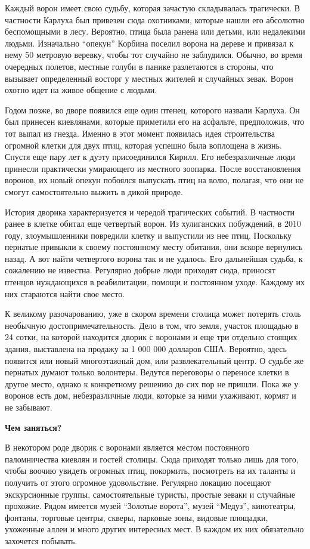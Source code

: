 Каждый ворон имеет свою судьбу, которая зачастую складывалась трагически. В
частности Карлуха был привезен сюда охотниками, которые нашли его абсолютно
беспомощными в лесу. Вероятно, птица была ранена или детьми, или недалекими
людьми. Изначально \enquote{опекун} Корбина поселил ворона на дереве и привязал
к нему 50 метровую веревку, чтобы тот случайно не заблудился. Обычно, во время
очередных полетов, местные голуби в панике разлетаются в стороны, что вызывает
определенный восторг у местных жителей и случайных зевак. Ворон охотно идет на
живое общение с людьми.

Годом позже, во дворе появился еще один птенец, которого назвали Карлуха. Он
был принесен киевлянами, которые приметили его на асфальте, предположив, что
тот выпал из гнезда. Именно в этот момент появилась идея строительства огромной
клетки для двух птиц, которая успешно была воплощена в жизнь. Спустя еще пару
лет к дуэту присоединился Кирилл. Его небезразличные люди принесли практически
умирающего из местного зоопарка. После восстановления воронов, их новый опекун
побоялся выпускать птиц на волю, полагая, что они не смогут самостоятельно
выжить в дикой природе. 

История дворика характеризуется и чередой трагических событий. В частности
ранее в клетке обитал еще четвертый ворон. Из хулиганских побуждений, в 2010
году, злоумышленники повредили клетку и выпустили из нее птиц. Поскольку
пернатые привыкли к своему постоянному месту обитания, они вскоре вернулись
назад. А вот найти четвертого ворона так и не удалось. Его дальнейшая судьба, к
сожалению не известна. Регулярно добрые люди приходят сюда, приносят птенцов
нуждающихся в реабилитации, помощи и постоянном уходе. Каждому их них стараются
найти свое место.

К великому разочарованию, уже в скором времени столица может потерять столь
необычную достопримечательность. Дело в том, что земля, участок площадью в 24
сотки, на которой находится дворик с воронами и еще три отдельно стоящих
здания, выставлена на продажу за 1 000 000 долларов США. Вероятно, здесь
появится или новый многоэтажный дом, или развлекательный центр. О судьбе же
пернатых думают только волонтеры. Ведутся переговоры о переносе клетки в другое
место, однако к конкретному решению до сих пор не пришли. Пока же у воронов
есть дом, небезразличные люди, которые за ними ухаживают, кормят и не забывают.

\textbf{Чем заняться?} 

В некотором роде дворик с воронами является местом постоянного паломничества
киевлян и гостей столицы. Сюда приходят только лишь для того, чтобы воочию
увидеть огромных птиц, покормить, посмотреть на их таланты и получить от этого
огромное удовольствие. Регулярно локацию посещают экскурсионные группы,
самостоятельные туристы, простые зеваки и случайные прохожие. Рядом имеется
музей \enquote{Золотые ворота}, музей \enquote{Медуз}, кинотеатры, фонтаны,
торговые центры, скверы, парковые зоны, видовые площадки, ухоженные аллеи и
много других интересных мест. В каждом их них обязательно захочется побывать.

